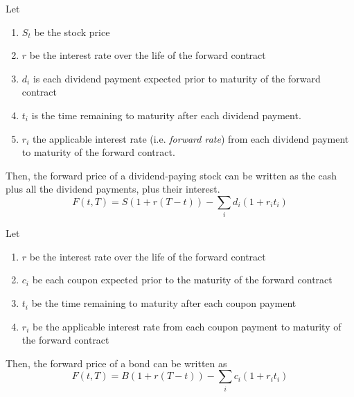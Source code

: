 \documentclass{article}
\begin{document}
    \begin{example}
      \label{ex:forward-price-of-dividend-paying-stock}
      Let 
      \begin{enumerate}
        \item $S_t$ be the stock price 
        \item $r$ be the interest rate over the life of the forward contract 
        \item $d_i$ is each dividend payment expected prior to maturity of the forward contract 
        \item $t_i$ is the time remaining to maturity after each dividend payment. 
        \item $r_i$ the applicable interest rate (i.e. \textit{forward rate}) from each dividend payment to maturity of the forward contract. 
      \end{enumerate}
      Then, the forward price of a dividend-paying stock can be written as the cash plus all the dividend payments, plus their interest. 
      \begin{equation}
        F(t, T) = S(1 + r (T - t)) - \sum_{i} d_i (1 + r_i t_i)
      \end{equation}
    \end{example}

    \begin{example}
      \label{ex:forward-price-of-bond}
      Let 
      \begin{enumerate}
        \item $r$ be the interest rate over the life of the forward contract 
        \item $c_i$ be each coupon expected prior to the maturity of the forward contract 
        \item $t_i$ be the time remaining to maturity after each coupon payment 
        \item $r_i$ be the applicable interest rate from each coupon payment to maturity of the forward contract
      \end{enumerate}
      Then, the forward price of a bond can be written as 
      \begin{equation}
        F(t, T) = B(1 + r(T - t)) - \sum_i c_i (1 + r_i t_i)
      \end{equation}
    \end{example}
\end{document}
